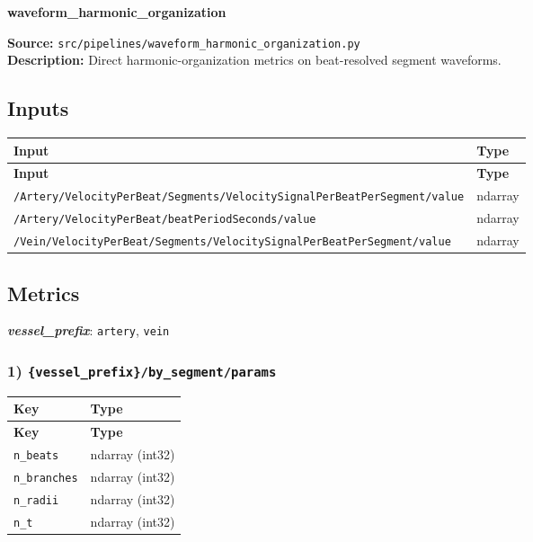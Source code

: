 \documentclass[11pt]{article}
\begin{document}
\begin{center}
\LARGE\textbf{waveform\_harmonic\_organization}
\end{center}
\textbf{Source:} \texttt{src/\allowbreak{}pipelines/\allowbreak{}waveform\_\allowbreak{}harmonic\_\allowbreak{}organization.py}\\
\textbf{Description:} Direct harmonic-organization metrics on beat-resolved segment waveforms.

\subsection*{Inputs}
\begin{longtable}{|p{}|p{}|}
\hline
\textbf{Input} & \textbf{Type} \\ \hline
\endfirsthead
\hline
\textbf{Input} & \textbf{Type} \\ \hline
\endhead
{\scriptsize \texttt{/\allowbreak{}Artery/\allowbreak{}VelocityPerBeat/\allowbreak{}Segments/\allowbreak{}VelocitySignalPerBeatPerSegment/\allowbreak{}value}} & ndarray \\ \hline
{\scriptsize \texttt{/\allowbreak{}Artery/\allowbreak{}VelocityPerBeat/\allowbreak{}beatPeriodSeconds/\allowbreak{}value}} & ndarray \\ \hline
{\scriptsize \texttt{/\allowbreak{}Vein/\allowbreak{}VelocityPerBeat/\allowbreak{}Segments/\allowbreak{}VelocitySignalPerBeatPerSegment/\allowbreak{}value}} & ndarray \\ \hline
\end{longtable}

\subsection*{Metrics}
\textbf{\textit{vessel\_prefix}}: \texttt{artery}, \texttt{vein}
\subsubsection*{1) \texttt{\{vessel\_\allowbreak{}prefix\}/\allowbreak{}by\_\allowbreak{}segment/\allowbreak{}params}}
\begin{longtable}{|p{}|p{}|}
\hline
\textbf{Key} & \textbf{Type} \\ \hline
\endfirsthead
\hline
\textbf{Key} & \textbf{Type} \\ \hline
\endhead
\texttt{n\_\allowbreak{}beats} & ndarray (int32) \\ \hline
\texttt{n\_\allowbreak{}branches} & ndarray (int32) \\ \hline
\texttt{n\_\allowbreak{}radii} & ndarray (int32) \\ \hline
\texttt{n\_\allowbreak{}t} & ndarray (int32) \\ \hline
\end{longtable}
\end{document}
